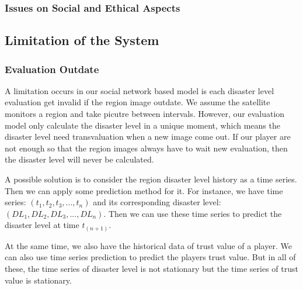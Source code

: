   \subsubsection{Issues on Social and Ethical Aspects}

\subsection{Limitation of the System}

\subsubsection{Evaluation Outdate}

A limitation occurs in our social network based model is each disaster level evaluation get invalid 
if the region image outdate. 
We assume the satellite monitors a region and take picutre between intervals. However, our evaluation
model only calculate the disaster level in a unique moment, which means the disaster level need 
transvaluation when a new image come out.
If our player are not enough so that the region images always have to wait new evaluation, then the
disaster level will never be calculated.

A possible solution is to consider the region disaster level history as a time series. Then we can apply
some prediction method for it. For instance, we have time series: $(t_1, t_2, t_3, ..., t_n)$
and its corresponding disaster level: $(DL_1, DL_2, DL_3, ..., DL_n)$.
Then we can use these time series to predict the disaster level at time $t_(n+1)$.

At the same time, we also have the historical data of trust value of a player. We can also
use time series prediction to predict the players trust value. But in all of these, the time series
of disaster level is not stationary but the time series of trust value is stationary.